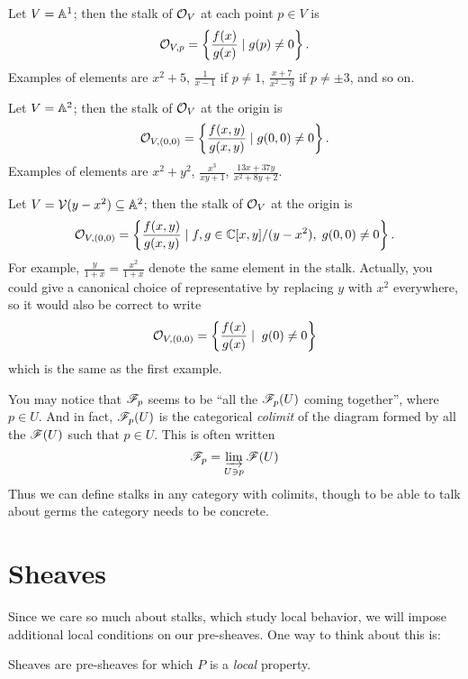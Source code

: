 \begin{example}
	\listhack
	\begin{enumerate}[(a)]
		\ii Let $V = \mathbb A^1$; then the stalk of $\mathcal O_V$
		at each point $p \in V$ is
		\[ \mathcal O_{V,p}
			= \left\{ \frac{f(x)}{g(x)} \mid g(p) \ne 0 \right\}. \]
		Examples of elements are $x^2+5$, $\frac{1}{x-1}$ if $p \ne 1$,
		$\frac{x+7}{x^2-9}$ if $p \ne \pm 3$, and so on.

		\ii Let $V = \mathbb A^2$;
		then the stalk of $\mathcal O_V$ at the origin is
		\[ \mathcal O_{V, (0,0)}
			= \left\{ \frac{f(x,y)}{g(x,y)} \mid g(0,0) \ne 0 \right\}. \]
		Examples of elements are $x^2+y^2$,
		$\frac{x^3}{xy+1}$, $\frac{13x+37y}{x^2+8y+2}$.

		\ii Let $V = \mathcal V(y-x^2) \subseteq \mathbb A^2$;
		then the stalk of $\mathcal O_V$ at the origin is
		\[ \mathcal O_{V, (0,0)}
			= \left\{ \frac{f(x,y)}{g(x,y)} \mid f,g \in \mathbb C[x,y] / (y-x^2),
				\; g(0,0) \ne 0 \right\}. \]
		For example, $\frac{y}{1+x} = \frac{x^2}{1+x}$
		denote the same element in the stalk.
		Actually, you could give a canonical choice of representative
		by replacing $y$ with $x^2$ everywhere, so it would also be
		correct to write
		\[ \mathcal O_{V, (0,0)}
			= \left\{ \frac{f(x)}{g(x)} \mid \; g(0) \ne 0 \right\} \]
		which is the same as the first example.
	\end{enumerate}
\end{example}

\begin{remark}
	You may notice that $\mathscr F_p$ seems to be
	``all the $\mathscr F_p(U)$ coming together'', where $p \in U$.
	And in fact, $\mathscr F_p(U)$ is the categorical \emph{colimit}
	of the diagram formed by all the $\mathscr F(U)$ such that $p \in U$.
	This is often written
	\[ \mathscr F_p = \varinjlim_{U \ni p} \mathscr F(U) \]
	Thus we can define stalks in any category with colimits,
	though to be able to talk about germs the category needs
	to be concrete.
\end{remark}

\section{Sheaves}

Since we care so much about stalks, which study local behavior,
we will impose additional local conditions on our pre-sheaves.
One way to think about this is:
\begin{moral}
	Sheaves are pre-sheaves for which $P$ is a \emph{local} property.
\end{moral}

